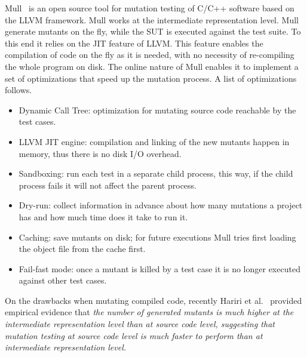 Mull~\cite{denisov2018mull} is an open source tool for mutation testing of C/C++ software based on the LLVM framework. Mull works at the intermediate representation level. 
Mull generate mutants on the fly, while the SUT is executed against the test suite. To this end it relies on the JIT feature of LLVM. This feature enables the compilation of code on the fly as it is needed, with no necessity of re-compiling the whole program on disk. The online nature of Mull enables it to implement a set of optimizations that speed up the mutation process. A list of optimizations follows.
\begin{itemize}
	\item Dynamic Call Tree: optimization for mutating source code reachable by the test cases.
	\item LLVM JIT engine: compilation and linking of the new mutants happen in memory, thus there is no disk I/O overhead.
	\item Sandboxing: run each test in a separate child process, this way, if the child process fails it will not affect the parent process.
	\item Dry-run: collect information in advance about how many mutations a project has and how much time does it take to run it.
	\item Caching: save mutants on disk; for future executions Mull tries first loading the object file from the cache first.
	\item Fail-fast mode: once a mutant is killed by a test case it is no longer executed against other test cases.
\end{itemize}

On the drawbacks when mutating compiled code, recently Hariri et al.~\cite{hariri2019comparing} provided empirical evidence that \textit{the number of generated mutants is much higher at the intermediate representation level than at source code level, suggesting that mutation testing at source code level is much faster to perform than at intermediate representation level.}




